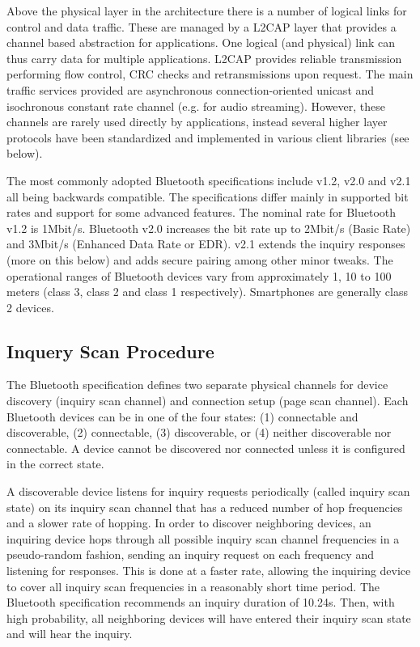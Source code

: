 Above the physical layer in the architecture there is a number of logical links for control and data traffic. These are managed by a L2CAP layer that provides a channel based abstraction for applications. One logical (and physical) link can thus carry data for multiple applications. L2CAP provides reliable transmission performing flow
control, CRC checks and retransmissions upon request. The main traffic services provided are asynchronous connection-oriented unicast and isochronous constant rate
channel (e.g. for audio streaming). However, these channels are rarely used directly by applications, instead several higher layer protocols have been standardized and
implemented in various client libraries (see below). 

The most commonly adopted Bluetooth specifications include v1.2, v2.0 and v2.1 all being backwards compatible. The specifications differ mainly in supported bit rates and support for some advanced features. The nominal rate for Bluetooth v1.2 is 1Mbit/s. Bluetooth v2.0 increases the bit rate up to 2Mbit/s (Basic Rate) and 3Mbit/s (Enhanced Data Rate or EDR). v2.1 extends the inquiry responses (more on this below) and adds secure pairing among other minor tweaks. The operational
ranges of Bluetooth devices vary from approximately 1, 10 to 100 meters (class 3, class 2 and class 1 respectively). Smartphones are generally class 2 devices.

\subsection{Inquery Scan Procedure}

The Bluetooth specification defines two separate physical channels for device discovery (inquiry scan channel) and connection setup (page scan channel). 
Each Bluetooth devices can be in one of the four states: (1) connectable and discoverable, (2) connectable, (3) discoverable, or (4) neither discoverable nor connectable. A device
cannot be discovered nor connected unless it is configured in the correct state.

A discoverable device listens for inquiry requests periodically (called inquiry scan state) on its inquiry scan channel that has a reduced number of hop frequencies and a
slower rate of hopping. In order to discover neighboring devices, an inquiring device hops through all possible inquiry scan channel frequencies in a pseudo-random
 fashion, sending an inquiry request on each frequency and listening for responses. This is done at a faster rate, allowing the inquiring device to cover all inquiry scan 
 frequencies in a reasonably short time period. The Bluetooth specification recommends an inquiry duration of 10.24s. Then, with high probability, all neighboring devices will
have entered their inquiry scan state and will hear the inquiry.

